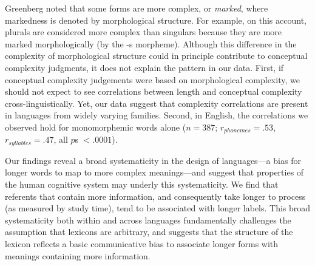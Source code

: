 \documentclass[12pt]{article}
\begin{document}


Greenberg\cite{greenberg1966} noted that some forms are more complex, or \emph{marked}, where markedness is denoted by morphological structure. For example, on this account, plurals are considered more complex than singulars because they are more marked morphologically (by the -s morpheme). Although this difference in the complexity of morphological structure could in principle contribute to conceptual complexity judgments, it does not explain the pattern in our data. First, if conceptual complexity judgements were based on morphological complexity, we should not expect to see correlations between length and conceptual complexity cross-linguistically. Yet, our data suggest that complexity correlations are present in languages from widely varying families. Second, in English, the correlations we observed hold for monomorphemic words alone ($n = 387$; $r_{phonemes} = .53$, $r_{syllables} = .47$, all $p$s $< .0001$). 

Our findings reveal a broad systematicity in the design of  languages---a bias for longer words to map to more complex meanings---and suggest that properties of the human cognitive system may underly this systematicity. We find that referents that contain more information, and consequently take longer to process (as measured by study time), tend to be associated with longer labels. This broad systematicity both within and across languages fundamentally challenges the assumption that lexicons are arbitrary, and suggests that the structure of the lexicon reflects a basic communicative bias to associate longer forms with meanings containing more information.
\end{document}
